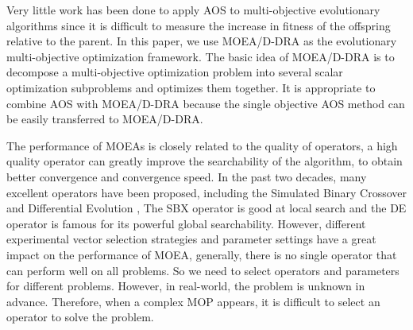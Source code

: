 \documentclass[journal]{IEEEtran}
\begin{document}
Very little work has been done to apply AOS to multi-objective evolutionary algorithms since it is difficult to measure the increase in fitness of the offspring relative to the parent.
% 
In this paper, we use MOEA/D-DRA \cite{moead-dra} as the evolutionary multi-objective optimization framework. The basic idea of MOEA/D-DRA is to decompose a multi-objective optimization problem into several scalar optimization subproblems and optimizes them together.
It is appropriate to combine AOS with MOEA/D-DRA because the single objective AOS method can be easily transferred to MOEA/D-DRA.

The performance of MOEAs is closely related to the quality of operators, a high quality operator can greatly improve the searchability of the algorithm, to obtain better convergence and convergence speed.
In the past two decades, many excellent operators have been proposed, including the Simulated Binary Crossover \cite{deb2006reference} and Differential Evolution \cite{storn1997differential}, The SBX operator is good at local search and the DE operator is famous for its powerful global searchability.
However, different experimental vector selection strategies and parameter settings have a great impact on the performance of MOEA, generally, there is no single operator that can perform well on all problems.
So we need to select operators and parameters for different problems. However, in real-world, the problem is unknown in advance. Therefore, when a complex MOP appears, it is difficult to select an operator to solve the problem.
\end{document}
